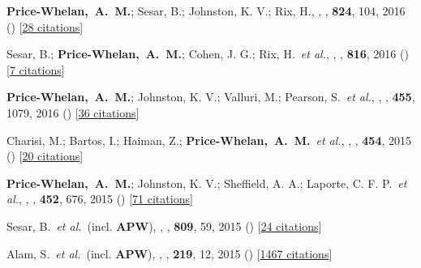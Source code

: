 \item[{\color{deemph}\scriptsize22}]\textbf{Price-Whelan,~A.~M.}; Sesar, B.; Johnston, K. V.; Rix, H., , \apj, \textbf{824}, 104, 2016 () [\href{http://adsabs.harvard.edu/abs/2016ApJ...824..104P}{28 citations}]

\item[{\color{deemph}\scriptsize21}]Sesar, B.; \textbf{Price-Whelan,~A.~M.}; Cohen, J. G.; Rix, H.~\textit{et al.}, , \apj, \textbf{816}, 2016 () [\href{http://adsabs.harvard.edu/abs/2016ApJ...816L...4S}{7 citations}]

\item[{\color{deemph}\scriptsize20}]\textbf{Price-Whelan,~A.~M.}; Johnston, K. V.; Valluri, M.; Pearson, S.~\textit{et al.}, , \mnras, \textbf{455}, 1079, 2016 () [\href{http://adsabs.harvard.edu/abs/2016MNRAS.455.1079P}{36 citations}]

\item[{\color{deemph}\scriptsize19}]Charisi, M.; Bartos, I.; Haiman, Z.; \textbf{Price-Whelan,~A.~M.}~\textit{et al.}, , \mnras, \textbf{454}, 2015 () [\href{http://adsabs.harvard.edu/abs/2015MNRAS.454L..21C}{20 citations}]

\item[{\color{deemph}\scriptsize18}]\textbf{Price-Whelan,~A.~M.}; Johnston, K. V.; Sheffield, A. A.; Laporte, C. F. P.~\textit{et al.}, , \mnras, \textbf{452}, 676, 2015 () [\href{http://adsabs.harvard.edu/abs/2015MNRAS.452..676P}{71 citations}]

\item[{\color{deemph}\scriptsize17}]Sesar, B.~\textit{et al.}~(incl. \textbf{APW}), , \apj, \textbf{809}, 59, 2015 () [\href{http://adsabs.harvard.edu/abs/2015ApJ...809...59S}{24 citations}]

\item[{\color{deemph}\scriptsize16}]Alam, S.~\textit{et al.}~(incl. \textbf{APW}), , \apjs, \textbf{219}, 12, 2015 () [\href{http://adsabs.harvard.edu/abs/2015ApJS..219...12A}{1467 citations}]

